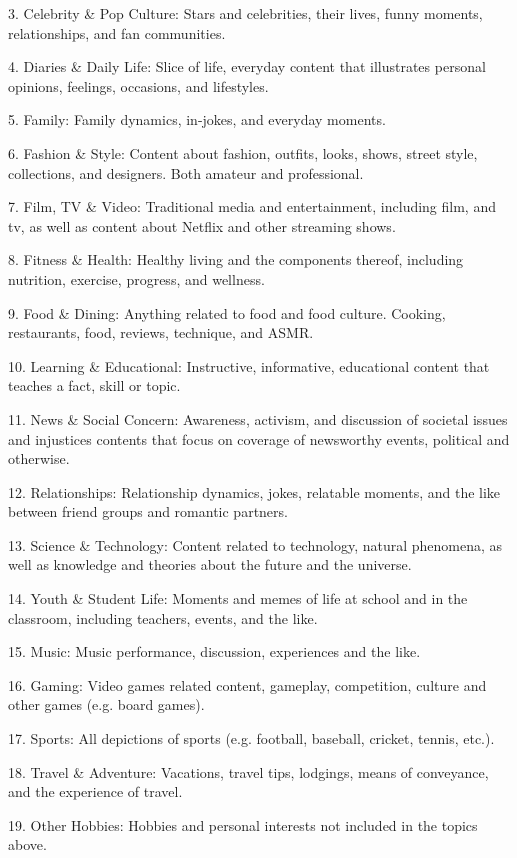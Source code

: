 3. Celebrity \& Pop Culture: Stars and celebrities, their lives, funny moments, relationships, and fan communities.

4. Diaries \& Daily Life: Slice of life, everyday content that illustrates personal opinions, feelings, occasions, and lifestyles.

5. Family: Family dynamics, in-jokes, and everyday moments.

6. Fashion \& Style: Content about fashion, outfits, looks, shows, street style, collections, and designers. Both amateur and professional.

7. Film, TV \& Video: Traditional media and entertainment, including film, and tv, as well as content about Netflix and other streaming shows.

8. Fitness \& Health: Healthy living and the components thereof, including nutrition, exercise, progress, and wellness.

9. Food \& Dining: Anything related to food and food culture. Cooking, restaurants, food, reviews, technique, and ASMR. 

10. Learning \& Educational: Instructive, informative, educational content that teaches a fact, skill or topic.

11. News \& Social Concern: Awareness, activism, and discussion of societal issues and injustices contents that focus on coverage of newsworthy events, political and otherwise.

12. Relationships: Relationship dynamics, jokes, relatable moments, and the like between friend groups and romantic partners.

13. Science \& Technology: Content related to technology, natural phenomena, as well as knowledge and theories about the future and the universe.

14. Youth \& Student Life: Moments and memes of life at school and in the classroom, including teachers, events, and the like.

15. Music: Music performance, discussion, experiences and the like.

16. Gaming: Video games related content, gameplay, competition, culture and other games (e.g. board games). 

17. Sports: All depictions of sports (e.g. football, baseball, cricket, tennis, etc.). 

18. Travel \& Adventure: Vacations, travel tips, lodgings, means of conveyance, and the experience of travel.

19. Other Hobbies: Hobbies and personal interests not included in the topics above.


